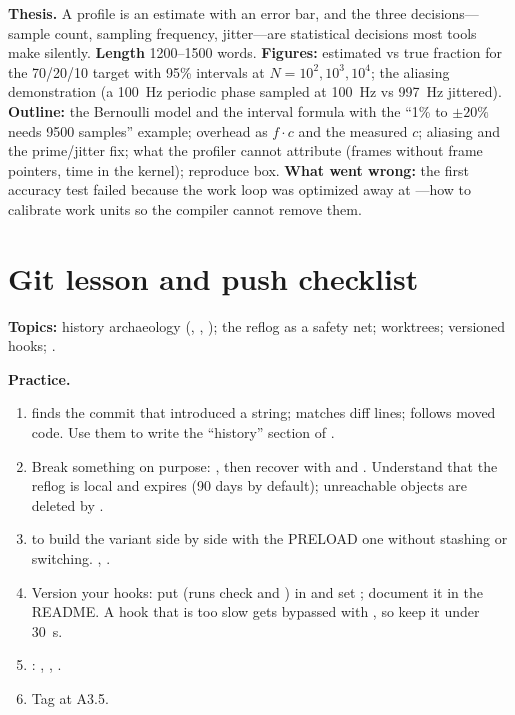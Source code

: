 \begin{blogbox}
\textbf{Thesis.} A profile is an estimate with an error bar, and the three decisions---sample count, sampling frequency, jitter---are statistical decisions most tools make silently. \textbf{Length} 1200--1500 words. \textbf{Figures:} estimated vs true fraction for the 70/20/10 target with 95\% intervals at $N = 10^2, 10^3, 10^4$; the aliasing demonstration (a 100~Hz periodic phase sampled at 100~Hz vs 997~Hz jittered). \textbf{Outline:} the Bernoulli model and the interval formula with the ``1\% to $\pm 20\%$ needs 9500 samples'' example; overhead as $f\cdot c$ and the measured $c$; aliasing and the prime/jitter fix; what the profiler cannot attribute (frames without frame pointers, time in the kernel); reproduce box. \textbf{What went wrong:} the first accuracy test failed because the work loop was optimized away at ---how to calibrate work units so the compiler cannot remove them.
\end{blogbox}

\section{Git lesson and push checklist}

\begin{gitbox}
\textbf{Topics:} history archaeology (, , ); the reflog as a safety net; worktrees; versioned hooks; .

\textbf{Practice.}
\begin{enumerate}
  \item {} finds the commit that introduced a string;  matches diff lines;  follows moved code. Use them to write the ``history'' section of .
  \item Break something on purpose: , then recover with  and . Understand that the reflog is local and expires (90 days by default); unreachable objects are deleted by .
  \item {} to build the  variant side by side with the PRELOAD one without stashing or switching. , .
  \item Version your hooks: put  (runs  check and ) in  and set ; document it in the README. A hook that is too slow gets bypassed with , so keep it under 30~s.
  \item {}: , , .
  \item Tag  at A3.5.
\end{enumerate}
\end{gitbox}
